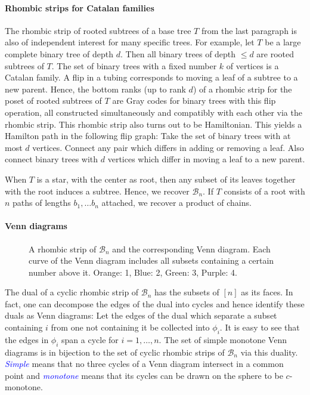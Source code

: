\documentclass[fontsize=11pt,a4paper,DIV=12]{scrartcl}
\newcommand{\defn}[1]{\textsl{\textcolor{Blue}{#1}}}
\begin{document}
\paragraph{Rhombic strips for Catalan families}
The rhombic strip of rooted subtrees of a base tree $T$ from the last paragraph is also of independent interest for many specific trees. For example, let $T$ be a large complete binary tree of depth $d$. Then all binary trees of depth $\le d$ are rooted subtrees of $T$. The set of binary trees with a fixed number $k$ of vertices is a Catalan family. A flip in a tubing corresponds to moving a leaf of a subtree to a new parent. Hence, the bottom ranks (up to rank $d$) of a rhombic strip for the poset of rooted subtrees of $T$ are Gray codes for binary trees with this flip operation, all constructed simultaneously and compatibly with each other via the rhombic strip. This rhombic strip also turns out to be Hamiltonian. This yields a Hamilton path in the following flip graph: Take the set of binary trees with at most $d$ vertices. Connect any pair which differs in adding or removing a leaf. Also connect binary trees with $d$ vertices which differ in moving a leaf to a new parent.

When $T$ is a star, with the center as root, then any subset of its leaves together with the root induces a subtree. Hence, we recover $\mathcal B_n$. If $T$ consists of a root with $n$ paths of lengths $b_1,\ldots b_n$ attached, we recover a product of chains.

\paragraph{Venn diagrams}
\begin{figure}
    \centering
    
    \caption{A rhombic strip of $\mathcal B_n$ and the corresponding Venn diagram. Each curve of the Venn diagram includes all subsets containing a certain number above it. Orange: 1, Blue: 2, Green: 3, Purple: 4.}
    \label{fig:Boolean4 venn}
\end{figure}
The dual of a cyclic rhombic strip of $\mathcal B_n$ has the subsets of $[n]$ as its faces. In fact, one can decompose the edges of the dual into cycles and hence identify these duals as Venn diagrams: Let the edges of the dual which separate a subset containing $i$ from one not containing it be collected into $\phi_i$. It is easy to see that the edges in $\phi_i$ span a cycle for $i=1,\ldots,n$. The set of simple monotone Venn diagrams is in bijection to the set of cyclic rhombic strips of $\mathcal B_n$ via this duality. \defn{Simple} means that no three cycles of a Venn diagram intersect in a common point and \defn{monotone} means that its cycles can be drawn on the sphere to be $c$-monotone.
\end{document}
